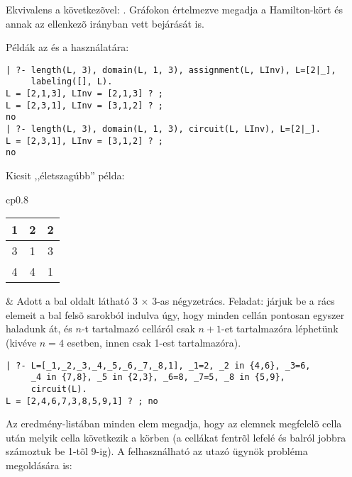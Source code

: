 \medskip

{}

Ekvivalens a következõvel: . Gráfokon értelmezve
megadja a Hamilton-kört és annak az ellenkezõ irányban vett bejárását is.

Példák az  és a  használatára:

\begin{verbatim}
| ?- length(L, 3), domain(L, 1, 3), assignment(L, LInv), L=[2|_], 
     labeling([], L).
L = [2,1,3], LInv = [2,1,3] ? ;
L = [2,3,1], LInv = [3,1,2] ? ;
no
| ?- length(L, 3), domain(L, 1, 3), circuit(L, LInv), L=[2|_].
L = [2,3,1], LInv = [3,1,2] ? ;
no
\end{verbatim}

Kicsit ,,életszagúbb'' példa:

\medskip

\begin{tabular}{cp{}}
\begin{tabular}{|c|c|c|}
\hline 1 & 2 & 2 \\ \hline 3 & 1 & 3 \\ \hline 4 & 4 & 1 \\ \hline
\end{tabular} &
\vspace{-1.5\baselineskip}
Adott a bal oldalt látható 3 $\times$ 3-as négyzetrács. Feladat: járjuk be
a rács elemeit a bal felsõ sarokból indulva úgy, hogy minden cellán pontosan
egyszer haladunk át, és $n$-t tartalmazó celláról csak $n+1$-et tartalmazóra
léphetünk (kivéve $n=4$ esetben, innen csak 1-est tartalmazóra). \\
\end{tabular}

\begin{verbatim}
| ?- L=[_1,_2,_3,_4,_5,_6,_7,_8,1], _1=2, _2 in {4,6}, _3=6, 
     _4 in {7,8}, _5 in {2,3}, _6=8, _7=5, _8 in {5,9}, 
     circuit(L).
L = [2,4,6,7,3,8,5,9,1] ? ; no
\end{verbatim}

Az eredmény-listában minden elem megadja, hogy az elemnek megfelelõ cella után
melyik cella következik a körben (a cellákat fentrõl lefelé és balról jobbra
számoztuk be 1-tõl 9-ig).
\br
A  felhasználható az utazó ügynök probléma megoldására is:

